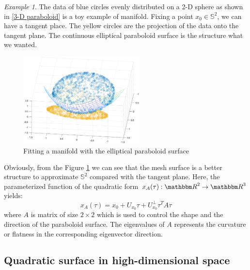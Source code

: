 \documentclass[aos,preprint]{imsart}
\theoremstyle{remark}
\newtheorem{example}{Example}
\begin{document}
\begin{example}
The data of blue circles evenly distributed on a 2-D sphere as shown in \eqref{3-D paraboloid} is a toy example of manifold. Fixing a point $x_0\in {\mathbb S}^2$, we can have a tangent place. The yellow circles are the projection of the data onto the tangent plane. The continuous elliptical paraboloid surface is the structure what we wanted.
\begin{figure}[h] %
   \centering
   \includegraphics[width=2.5in]{demo.eps} 
   \caption{ Fitting a manifold with the elliptical paraboloid surface}
   \label{3-D paraboloid}
\end{figure}

Obviously, from the Figure \ref{3-D paraboloid} we can see that the mesh surface is a better structure to approximate $\mathbb{S}^2$ compared with the tangent plane. Here,  the parameterized function of the quadratic form  $x_A(\tau): {\mathbbm R}^2\rightarrow {\mathbbm R}^3$ yields:
\[
x_A(\tau) = x_0 + U_{x_0} \tau + {U_{x_0}^\perp} \tau^T A \tau
\]
where $A$ is matrix of size $2\times 2$ which is used to control the shape and the direction of the paraboloid surface. The eigenvalues of $A$ represents the curvature or flatness in the corresponding eigenvector direction.
\end{example}
\subsection{Quadratic surface in high-dimensional space }
\end{document}
